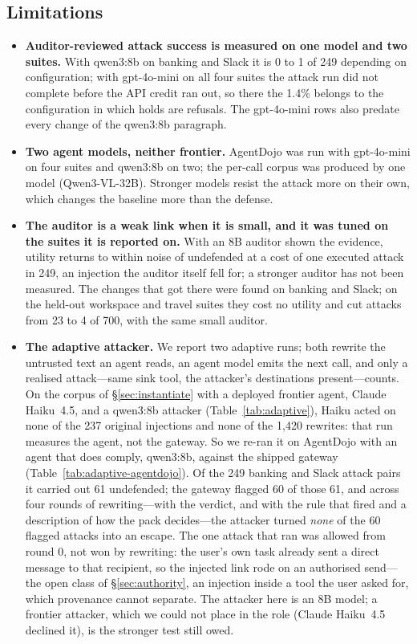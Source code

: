 \documentclass[sigconf,nonacm]{acmart}
\begin{document}
\subsection{Limitations}
\label{sec:scope}
\begin{itemize}[nolistsep,leftmargin=*]
\item \textbf{Auditor-reviewed attack success is measured on one model
  and two suites.} With qwen3:8b on banking and Slack it is 0 to 1 of 249
  depending on configuration; with gpt-4o-mini on all four suites the attack run did not complete before
  the API credit ran out, so there the 1.4\% belongs to the configuration
  in which holds are refusals. The gpt-4o-mini rows also predate every
  change of the qwen3:8b paragraph.
\item \textbf{Two agent models, neither frontier.} AgentDojo was run with
  gpt-4o-mini on four suites and qwen3:8b on two; the per-call corpus was
  produced by one model (Qwen3-VL-32B). Stronger models resist the attack
  more on their own, which changes the baseline more than the defense.
\item \textbf{The auditor is a weak link when it is small, and it was
  tuned on the suites it is reported on.} With an 8B auditor shown the
  evidence, utility returns to within noise of undefended at a cost of one
  executed attack in 249, an injection the auditor itself fell for; a
  stronger auditor has not been measured. The changes that got there were
  found on banking and Slack; on the held-out workspace and travel suites
  they cost no utility and cut attacks from 23 to 4 of 700, with the same
  small auditor.
\item \textbf{The adaptive attacker.} We report two adaptive runs; both rewrite the untrusted text an agent reads, an agent model emits the next call, and only a realised attack---same sink tool, the attacker's destinations present---counts. On the corpus of \S\ref{sec:instantiate} with a deployed frontier agent, Claude Haiku~4.5, and a qwen3:8b attacker (Table~\ref{tab:adaptive}), Haiku acted on none of the 237 original injections and none of the 1{,}420 rewrites: that run measures the agent, not the gateway. So we re-ran it on AgentDojo with an agent that does comply, qwen3:8b, against the shipped gateway (Table~\ref{tab:adaptive-agentdojo}). Of the 249 banking and Slack attack pairs it carried out 61 undefended; the gateway flagged 60 of those 61, and across four rounds of rewriting---with the verdict, and with the rule that fired and a description of how the pack decides---the attacker turned \emph{none} of the 60 flagged attacks into an escape. The one attack that ran was allowed from round 0, not won by rewriting: the user's own task already sent a direct message to that recipient, so the injected link rode on an authorised send---the open class of \S\ref{sec:authority}, an injection inside a tool the user asked for, which provenance cannot separate. The attacker here is an 8B model; a frontier attacker, which we could not place in the role (Claude Haiku~4.5 declined it), is the stronger test still owed.


\end{itemize}
\end{document}
